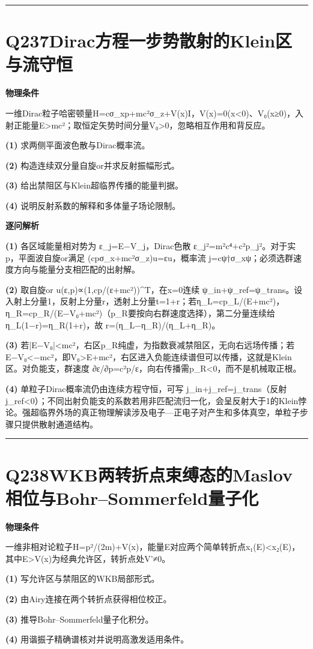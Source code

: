 \documentclass[UTF8,a4paper,11pt,oneside,openany]{ctexbook}
\begin{document}
\par\bigskip\hrule\bigskip
\section*{Q237\quad Dirac方程一步势散射的Klein区与流守恒}
\textbf{物理条件}\par 一维Dirac粒子哈密顿量H=cσ\_xp+mc²σ\_z+V(x)I，V(x)=0(x<0)、V₀(x≥0)，入射正能量E>mc²；取恒定矢势时间分量V₀>0，忽略相互作用和背反应。
\par\noindent\textbf{(1)} 求两侧平面波色散与Dirac概率流。
\par\noindent\textbf{(2)} 构造连续双分量自旋or并求反射振幅形式。
\par\noindent\textbf{(3)} 给出禁阻区与Klein超临界传播的能量判据。
\par\noindent\textbf{(4)} 说明反射系数的解释和多体量子场论限制。

\par\medskip\noindent\textbf{逐问解析}
\par\noindent\textbf{(1)} 各区域能量相对势为 ε\_j=E−V\_j，Dirac色散 ε\_j²=m²c⁴+c²p\_j²。对于实p，平面波自旋or满足 (cpσ\_x+mc²σ\_z)u=εu，概率流 j=cψ†σ\_xψ；必须选群速度方向与能量分支相匹配的出射解。
\par\noindent\textbf{(2)} 取自旋or u(ε,p)∝(1,cp/(ε+mc²))\textasciicircum{}T，在x=0连续 ψ\_in+ψ\_ref=ψ\_trans。设入射上分量1，反射上分量r，透射上分量t=1+r；若η\_L=cp\_L/(E+mc²)，η\_R=cp\_R/(E−V₀+mc²)（p\_R要按向右群速度选择），第二分量连续给 η\_L(1−r)=η\_R(1+r)，故 r=(η\_L−η\_R)/(η\_L+η\_R)。
\par\noindent\textbf{(3)} 若|E−V₀|<mc²，右区p\_R纯虚，为指数衰减禁阻区，无向右远场传播；若E−V₀<−mc²，即V₀>E+mc²，右区进入负能连续谱但可以传播，这就是Klein区。对负能支，群速度 ∂ε/∂p=c²p/ε，向右传播需p\_R<0，而不是机械取正根。
\par\noindent\textbf{(4)} 单粒子Dirac概率流仍由连续方程守恒，可写 j\_in+j\_ref=j\_trans（反射j\_ref<0）；不同出射负能支的系数若用非匹配流归一化，会呈反射大于1的Klein悖论。强超临界外场的真正物理解读涉及电子—正电子对产生和多体真空，单粒子步骤只提供散射通道结构。

\par\bigskip\hrule\bigskip
\section*{Q238\quad WKB两转折点束缚态的Maslov相位与Bohr–Sommerfeld量子化}
\textbf{物理条件}\par 一维非相对论粒子H=p²/(2m)+V(x)，能量E对应两个简单转折点x₁(E)<x₂(E)，其中E>V(x)为经典允许区，转折点处V'≠0。
\par\noindent\textbf{(1)} 写允许区与禁阻区的WKB局部形式。
\par\noindent\textbf{(2)} 由Airy连接在两个转折点获得相位校正。
\par\noindent\textbf{(3)} 推导Bohr–Sommerfeld量子化积分。
\par\noindent\textbf{(4)} 用谐振子精确谱核对并说明高激发适用条件。
\end{document}
